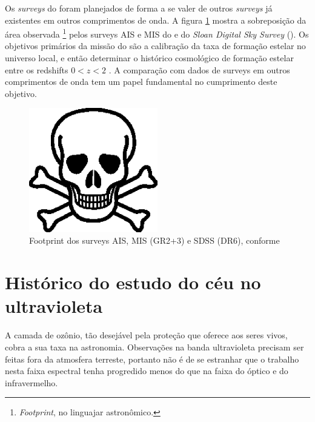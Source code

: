 Os {\em surveys} do \galex{} foram planejados de forma a se valer de outros {\em
surveys} já existentes em outros comprimentos de onda. A figura
\ref{fig:GalexSDSSOverlap} mostra a sobreposição da área observada
\footnote{{\em Footprint}, no linguajar astronômico.} pelos surveys AIS e MIS do
\galex{} e do {\em Sloan Digital Sky Survey} (\SDSS). Os objetivos primários da
missão do \galex{} são a calibração da taxa de formação estelar no universo
local, e então determinar o histórico cosmológico de formação estelar entre os
redshifts $0 < z < 2$ \citep{Martin2005}. A comparação com dados de surveys em
outros comprimentos de onda tem um papel fundamental no cumprimento deste
objetivo.

\begin{figure}
	\includegraphics[width=0.5\textwidth]{figuras/test.eps}
	\caption[Footprint dos surveys \galex AIS, MIS e SDSS]
	{Footprint dos surveys \galex AIS, MIS (GR2+3) e SDSS (DR6),
	conforme \cite{Budavari2009}}
	\label{fig:GalexSDSSOverlap}
\end{figure}




\section{Histórico do estudo do céu no ultravioleta}
\label{sec:Galex:CeuUV}

A camada de ozônio, tão desejável pela proteção que oferece aos seres vivos,
cobra a sua taxa na astronomia. Observações na banda ultravioleta precisam ser
feitas fora da atmosfera terreste, portanto não é de se estranhar que o trabalho
nesta faixa espectral tenha progredido menos do que na faixa do óptico e do
infravermelho.\citneed

